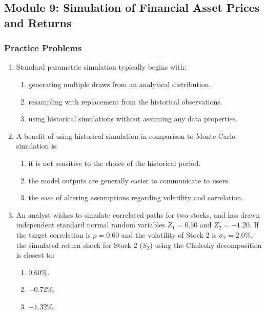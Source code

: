 \newpage

\subsection{Module 9: Simulation of Financial Asset Prices and Returns}
\label{sec:app_Problems_M9}

\subsubsection{Practice Problems}
\label{subsec:app_Problems_M9}

\begin{enumerate}
	\item Standard parametric simulation typically begins with:
	      \begin{enumerate}[label=\Alph*.]
		      \item generating multiple draws from an analytical distribution.
		      \item resampling with replacement from the historical observations.
		      \item using historical simulations without assuming any data properties.
	      \end{enumerate}

	\item A benefit of using historical simulation in comparison to Monte Carlo simulation is:
	      \begin{enumerate}[label=\Alph*.]
		      \item it is not sensitive to the choice of the historical period.
		      \item the model outputs are generally easier to communicate to users.
		      \item the ease of altering assumptions regarding volatility and correlation.
	      \end{enumerate}

	\item An analyst wishes to simulate correlated paths for two stocks, and has drawn independent standard normal random variables $Z_1 = 0.50$ and $Z_2 = -1.20$. If the target correlation is $\rho = 0.60$ and the volatility of Stock 2 is $\sigma_2 = 2.0\%$, the simulated return shock for Stock 2 ($S_2$) using the Cholesky decomposition is closest to:
	      \begin{enumerate}[label=\Alph*.]
		      \item $0.60\%$.
		      \item $-0.72\%$.
		      \item $-1.32\%$.
	      \end{enumerate}


\end{enumerate}
